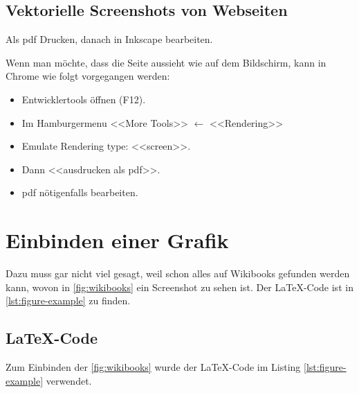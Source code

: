 \subsection{Vektorielle Screenshots von Webseiten}
Als pdf Drucken, danach in Inkscape bearbeiten.

Wenn man möchte, dass die Seite aussieht wie auf dem Bildschirm,
kann in Chrome wie folgt vorgegangen werden:
\begin{itemize}
	\item Entwicklertools öffnen (F12).
	\item Im Hamburgermenu <<More Tools>> $\leftarrow$ <<Rendering>>
	\item Emulate Rendering type: <<screen>>.
	\item Dann <<ausdrucken als pdf>>.
	\item pdf nötigenfalls bearbeiten.
\end{itemize}

\section{Einbinden einer Grafik}



Dazu muss gar nicht viel gesagt, weil schon alles
auf Wikibooks \cite{figures} gefunden werden kann, 
wovon in \autoref{fig:wikibooks} ein
Screenshot zu sehen ist. Der \LaTeX-Code ist in 
\autoref{lst:figure-example} zu finden.

\subsection{\LaTeX-Code}
Zum Einbinden der \autoref{fig:wikibooks}
wurde der \LaTeX-Code im Listing 
\ref{lst:figure-example} verwendet.


